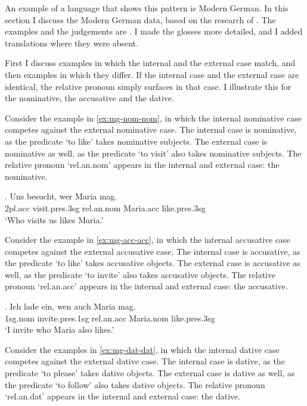 An example of a language that shows this pattern is Modern German. In this section I discuss the Modern German data, based on the research of \citet{vogel2001}. The examples and the judgements are . I made the glosses more detailed, and I added translations where they were absent.

First I discuss examples in which the internal and the external case match, and then examples in which they differ. If the internal case and the external case are identical, the relative pronoun simply surfaces in that case. I illustrate this for the nominative, the accusative and the dative.

Consider the example in \ref{ex:mg-nom-nom}, in which the internal nominative case competes against the external nominative case.
The internal case is nominative, as the predicate  `to like' takes nominative subjects.
The external case is nominative as well, as the predicate  `to visit' also takes nominative subjects.
The relative pronoun  `\ac{rel}.\ac{an}.\ac{nom}' appears in the internal and external case: the nominative.

\exg. Uns besucht, wer Maria mag.\\
 2\ac{pl}.\ac{acc} visit.\ac{pres}.3\ac{sg}\scsub{[nom]} \ac{rel}.\ac{an}.\ac{nom} Maria.\ac{acc} like.\ac{pres}.3\ac{sg}\scsub{[nom]}\\
 `Who visits us likes Maria.' \label{ex:mg-nom-nom}

Consider the example in \ref{ex:mg-acc-acc}, in which the internal accusative case competes against the external accusative case.
The internal case is accusative, as the predicate  `to like' takes accusative objects.
The external case is accusative as well, as the predicate  `to invite' also takes accusative objects.
The relative pronoun  `\ac{rel}.\ac{an}.\ac{acc}' appears in the internal and external case: the accusative.

\exg. Ich {lade ein}, wen auch Maria mag.\\
 1\ac{sg}.\ac{nom} invite.\ac{pres}.1\ac{sg}\scsub{[acc]} \ac{rel}.\ac{an}.\ac{acc} Maria.\ac{nom} like.\ac{pres}.3\ac{sg}\scsub{[acc]}\\
 `I invite who Maria also likes.' \label{ex:mg-acc-acc}

Consider the examples in \ref{ex:mg-dat-dat}, in which the internal dative case competes against the external dative case.
The internal case is dative, as the predicate  `to please' takes dative objects.
The external case is dative as well, as the predicate  `to follow' also takes dative objects.
The relative pronoun  `\ac{rel}.\ac{an}.\ac{dat}' appears in the internal and external case: the dative.

